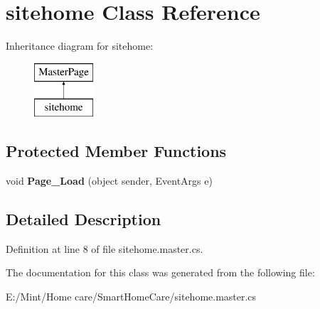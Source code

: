 \hypertarget{classsitehome}{\section{sitehome Class Reference}
\label{classsitehome}
}
Inheritance diagram for sitehome\-:\begin{figure}[H]
\begin{center}
\leavevmode
\includegraphics[height=2.000000cm]{classsitehome}
\end{center}
\end{figure}
\subsection*{Protected Member Functions}
\begin{DoxyCompactItemize}
\item 
\hypertarget{classsitehome_a3e5d32e94374bb2d2f8fd9ab72e12f39}{void {\bfseries Page\-\_\-\-Load} (object sender, Event\-Args e)}\label{classsitehome_a3e5d32e94374bb2d2f8fd9ab72e12f39}

\end{DoxyCompactItemize}


\subsection{Detailed Description}


Definition at line 8 of file sitehome.\-master.\-cs.



The documentation for this class was generated from the following file\-:\begin{DoxyCompactItemize}
\item 
E\-:/\-Mint/\-Home care/\-Smart\-Home\-Care/sitehome.\-master.\-cs\end{DoxyCompactItemize}
